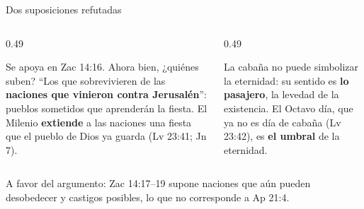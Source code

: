 \documentclass[hyperref={bookmarks=false},aspectratio=169]{beamer}
\newcommand{\destacar}[1]{\textbf{\textcolor{tierraroja}{#1}}}
\begin{document}
\begin{frame}{Dos suposiciones refutadas}
\begin{columns}[t,onlytextwidth]
\begin{column}{0.49\textwidth}
\begin{tcolorbox}[colback=papiro,colframe=tierraroja!70,boxrule=0.8pt,arc=2pt,left=4pt,right=4pt,title={\scriptsize 1. ``En el Milenio, no ahora''},fonttitle=\bfseries,coltitle=papiro,colbacktitle=tierraroja!80]
\scriptsize Se apoya en Zac 14:16. Ahora bien, ¿quiénes suben? ``Los que sobrevivieren de las \destacar{naciones que vinieron contra Jerusalén}'': pueblos sometidos que aprenderán la fiesta. El Milenio \destacar{extiende} a las naciones una fiesta que el pueblo de Dios ya guarda (Lv 23:41; Jn 7).
\end{tcolorbox}
\end{column}
\begin{column}{0.49\textwidth}
\begin{tcolorbox}[colback=papiro,colframe=tierraroja!70,boxrule=0.8pt,arc=2pt,left=4pt,right=4pt,title={\scriptsize 2. ``Sukkot simboliza la eternidad''},fonttitle=\bfseries,coltitle=papiro,colbacktitle=tierraroja!80]
\scriptsize La cabaña no puede simbolizar la eternidad: su sentido es \destacar{lo pasajero}, la levedad de la existencia. El Octavo día, que ya no es día de cabaña (Lv 23:42), es \destacar{el umbral} de la eternidad.
\end{tcolorbox}
\end{column}
\end{columns}\par\medskip
\small A favor del argumento: Zac 14:17--19 supone naciones que aún pueden desobedecer y castigos posibles, lo que no corresponde a Ap 21:4.
\end{frame}
\end{document}
